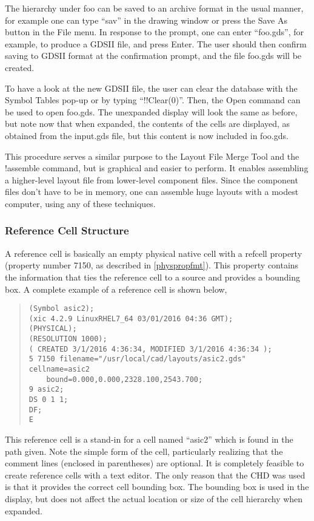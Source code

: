 The hierarchy under {\vt foo} can be saved to an archive format in the
usual manner, for example one can type ``{\vt sav}'' in the drawing
window or press the {\cb Save As} button in the {\cb File} menu.  In
response to the prompt, one can enter ``{\vt foo.gds}'', for example,
to produce a GDSII file, and press {\kb Enter}.  The user should then
confirm saving to GDSII format at the confirmation prompt, and the
file {\vt foo.gds} will be created.

To have a look at the new GDSII file, the user can clear the database
with the {\cb Symbol Tables} pop-up or by typing ``{\vt !!Clear(0)}''. 
Then, the {\cb Open} command can be used to open {\vt foo.gds}.  The
unexpanded display will look the same as before, but note now that
when expanded, the contents of the cells are displayed, as obtained
from the {\vt input.gds} file, but this content is now included in
{\vt foo.gds}.

This procedure serves a similar purpose to the {\cb Layout File Merge
Tool} and the {\cb !assemble} command, but is graphical and easier to
perform.  It enables assembling a higher-level layout file from
lower-level component files.  Since the component files don't have to
be in memory, one can assemble huge layouts with a modest computer,
using any of these techniques.

\subsubsection{Reference Cell Structure}

A reference cell is basically an empty physical native cell with a
{\et refcell} property (property number 7150, as described in
\ref{physpropfmt}).  This property contains the information that ties
the reference cell to a source and provides a bounding box.  A
complete example of a reference cell is shown below,

\begin{quote}
\begin{verbatim}
(Symbol asic2);
(xic 4.2.9 LinuxRHEL7_64 03/01/2016 04:36 GMT);
(PHYSICAL);
(RESOLUTION 1000);
( CREATED 3/1/2016 4:36:34, MODIFIED 3/1/2016 4:36:34 );
5 7150 filename="/usr/local/cad/layouts/asic2.gds" cellname=asic2
    bound=0.000,0.000,2328.100,2543.700;
9 asic2;
DS 0 1 1;
DF;
E
\end{verbatim}
\end{quote}

This reference cell is a stand-in for a cell named ``{\vt asic2}''
which is found in the path given.  Note the simple form of the cell,
particularly realizing that the comment lines (enclosed in
parentheses) are optional.  It is completely feasible to create
reference cells with a text editor.  The only reason that the CHD was
used is that it provides the correct cell bounding box.  The bounding
box is used in the display, but does not affect the actual location or
size of the cell hierarchy when expanded.


